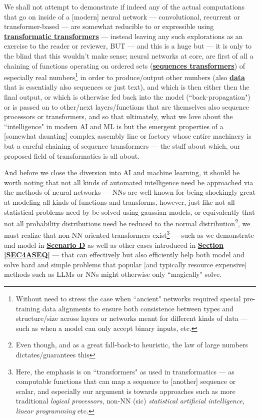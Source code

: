 \documentclass[a4paper, 18pt]{book} %
\begin{document}
\begin{appendices}
\vspace{2em}

We shall not attempt to demonstrate if indeed any of the actual computations that go on inside of a [modern] neural network --- convolutional, recurrent or transformer-based --- are somewhat reducible to or expressible using \textbf{\hyperref[RES7]{transformatic transformers}} --- instead leaving any such explorations as an exercise to the reader or reviewer, BUT --- and this is a huge but --- it is only to the blind that this wouldn't make sense; neural networks at core, are first of all a chaining of functions operating on ordered sets (\textbf{\hyperref[DEFSEQUENCE]{sequences transformers}}) of especially real numbers\footnote{Without need to stress the case when ``ancient" networks required special pre-training data alignments to ensure both consistence between types and structure/size across layers or networks meant for different kinds of data\cite{Graves2012} --- such as when a model can only accept binary inputs, etc.} in order to produce/output other numbers (also \textbf{\hyperref[SECRELSTAT]{data}} that is essentially also sequences or just text\cite{lutalo2024software}), and which is then either then the final output, or which is otherwise fed back into the model (``back-propagation") or is passed on to other/next layers/functions that are themselves also sequence processors or transformers, and so that ultimately, what we love about the ``intelligence" in modern AI and ML is but the emergent properties of a [somewhat daunting] complex assembly line or factory whose entire machinery is but a careful chaining of sequence transformers --- the stuff about which, our proposed field of transformatics is all about.

\vspace{2em}

And before we close the diversion into AI and machine learning, it should be worth noting that not all kinds of automated intelligence need be approached via the methods of neural networks --- NNs are well-known for being shockingly great at modeling all kinds of functions and transforms, however, just like not all statistical problems need by be solved using gaussian models, or equivalently that not all probability distributions need be reduced to the normal distribution\footnote{Even though, and as a great fall-back-to heuristic, the law of large numbers dictates/guarantees this\cite{clarke1992basic}}, we must realize that non-NN oriented transformers exist\footnote{Here, the emphasis is on ``transformers" as used in transformatics --- as computable functions that can map a sequence to [another] sequence or scalar, and especially our argument is towards approaches such as more traditional \textit{logical processors}, non-NN (sic) \textit{statistical artificial intelligence}, \textit{linear programming} etc.} --- such as we demonstrate and model in \textbf{\hyperref[SECSCEND]{Scenario D}} as well as other cases introduced in \textbf{\hyperref[SEC4ASEQ]{Section \ref{SEC4ASEQ}}} --- that can effectively but also efficiently help both model and solve hard and simple problems that popular [and typically resource expensive] methods such as LLMs or NNs might otherwise only ``magically" solve.


\end{appendices}
\end{document}
